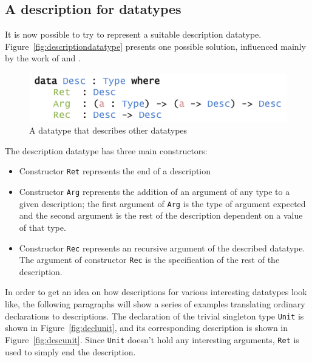 \documentclass{ituthesis}
\newcommand{\ttconstructor}[1]{\textcolor{constructor-color}{\texttt{#1}}}
\newcommand{\tttype}[1]{\textcolor{type-color}{\texttt{#1}}}
\begin{document}
\subsection{A description for datatypes}
\label{sub:ADescriptionforDatatypes}
It is now possible to try to represent a suitable description datatype. Figure~\ref{fig:descriptiondatatype} presents one possible solution, influenced mainly by the work of \cite{mcbride2010ornamental} and \cite{diehl2014eliminators}.

\begin{figure}[ht]
\begin{center}
    \includegraphics[scale=0.5]{Figures/ADescriptionforDatatypesSimple.png}
\end{center}
\caption{A datatype that describes other datatypes}
\label{fig:simpldescdatatype}
\end{figure}

The description datatype has three main constructors:
\begin{itemize}
  \item  Constructor \ttconstructor{Ret} represents the end of a description
  \item  Constructor \ttconstructor{Arg} represents the addition of an argument of any type to a given description; the first argument of \ttconstructor{Arg} is the type of argument expected and the second argument is the rest of the description dependent on a value of that type.
  \item  Constructor \ttconstructor{Rec} represents an recursive argument of the described datatype. The argument of constructor \ttconstructor{Rec} is the specification of the rest of the description.
\end{itemize}

In order to get an idea on how descriptions for various interesting datatypes look like, the following paragraphs will show a series of examples translating ordinary declarations to descriptions.
The declaration of the trivial singleton type \tttype{Unit} is shown in Figure~\ref{fig:declunit}, and its corresponding description is shown in Figure~\ref{fig:descunit}. Since \tttype{Unit} doesn't hold
any interesting arguments, \ttconstructor{Ret} is used to simply end the description.
\end{document}
